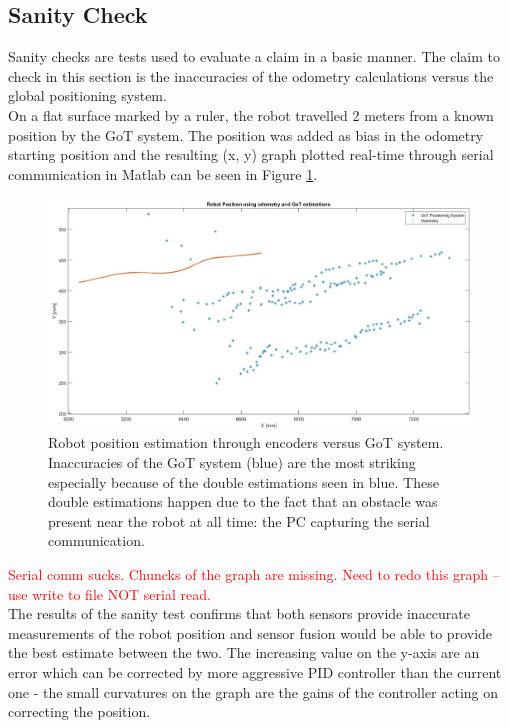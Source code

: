 \subsection{Sanity Check}

Sanity checks are tests used to evaluate a claim in a basic manner. The claim to check in this section is the inaccuracies of the odometry calculations versus the global positioning system.\\

On a flat surface marked by a ruler, the robot travelled  2 meters from a known position by the GoT system. The position was added as bias in the odometry starting position and the resulting (x, y) graph plotted real-time through serial communication in Matlab can be seen in Figure \ref{figure:sanitycheck_got}.

\begin{figure}[H]
\includegraphics[scale=0.45]{Figures/sanity_check_got.jpg}
\centering
\caption{Robot position estimation through encoders versus GoT system. Inaccuracies of the GoT system (blue) are the most striking especially because of the double estimations seen in blue. These double estimations happen due to the fact that an obstacle was present near the robot at all time: the PC capturing the serial communication.}
\label{figure:sanitycheck_got}
\end{figure}

\textcolor{red}{Serial comm sucks. Chuncks of the graph are missing. Need to redo this graph -- use write to file NOT serial read.}\\

The results of the sanity test confirms that both sensors provide inaccurate measurements of the robot position and sensor fusion would be able to provide the best estimate between the two. The increasing value on the y-axis are an error which can be corrected by more aggressive PID controller than the current one - the small curvatures on the graph are the gains of the controller acting on correcting the position.


